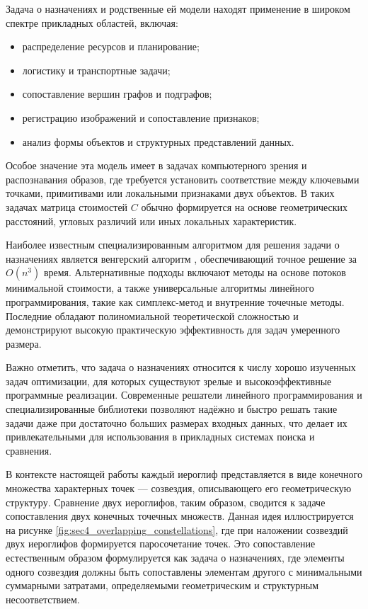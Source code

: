 Задача о назначениях и родственные ей модели находят применение в широком спектре прикладных областей, включая:
\begin{itemize}
    \item распределение ресурсов и планирование;
    \item логистику и транспортные задачи;
    \item сопоставление вершин графов и подграфов;
    \item регистрацию изображений и сопоставление признаков;
    \item анализ формы объектов и структурных представлений данных.
\end{itemize}
Особое значение эта модель имеет в задачах компьютерного зрения и распознавания образов, где требуется установить соответствие между ключевыми точками, примитивами или локальными признаками двух объектов. В таких задачах матрица стоимостей $C$ обычно формируется на основе геометрических расстояний, угловых различий или иных локальных характеристик.

Наиболее известным специализированным алгоритмом для решения задачи о назначениях является венгерский алгоритм \cite{kuhn1955hungarian}, обеспечивающий точное решение за $O(n^3)$ время. Альтернативные подходы включают методы на основе потоков минимальной стоимости, а также универсальные алгоритмы линейного программирования, такие как симплекс-метод и внутренние точечные методы. Последние обладают полиномиальной теоретической сложностью и демонстрируют высокую практическую эффективность для задач умеренного размера.

Важно отметить, что задача о назначениях относится к числу хорошо изученных задач оптимизации, для которых существуют зрелые и высокоэффективные программные реализации. Современные решатели линейного программирования и специализированные библиотеки \cite{mitchell2011pulp} позволяют надёжно и быстро решать такие задачи даже при достаточно больших размерах входных данных, что делает их привлекательными для использования в прикладных системах поиска и сравнения.

В контексте настоящей работы каждый иероглиф представляется в виде конечного множества характерных точек — созвездия, описывающего его геометрическую структуру. Сравнение двух иероглифов, таким образом, сводится к задаче сопоставления двух конечных точечных множеств. Данная идея иллюстрируется на рисунке \cref{fig:sec4_overlapping_constellations}, где при наложении созвездий двух иероглифов формируется паросочетание точек. Это сопоставление естественным образом формулируется как задача о назначениях, где элементы одного созвездия должны быть сопоставлены элементам другого с минимальными суммарными затратами, определяемыми геометрическим и структурным несоответствием.

